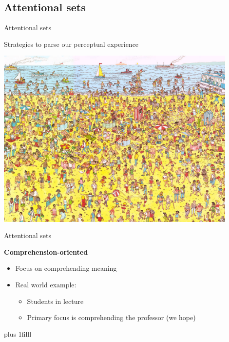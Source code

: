 \documentclass{beamer}
\newcommand{\btVFill}{\vskip0pt plus 1filll}
\begin{document}
\subsection{Attentional sets}

\begin{frame}{Attentional sets}

Strategies to parse our perceptual experience

\includegraphics[width=0.9\textwidth]{pictures/waldo}

\end{frame}

\begin{frame}{Attentional sets}

\textbf{Comprehension-oriented}
\begin{itemize}
\item Focus on comprehending meaning
\item Real world example:

\begin{itemize}
\item Students in lecture
\item Primary focus is comprehending the professor (we hope)
\end{itemize}

\end{itemize}
\btVFill
\begin{flushright}
\scriptsize
\citet{Pitt2012}
\end{flushright}

\end{frame}
\end{document}
